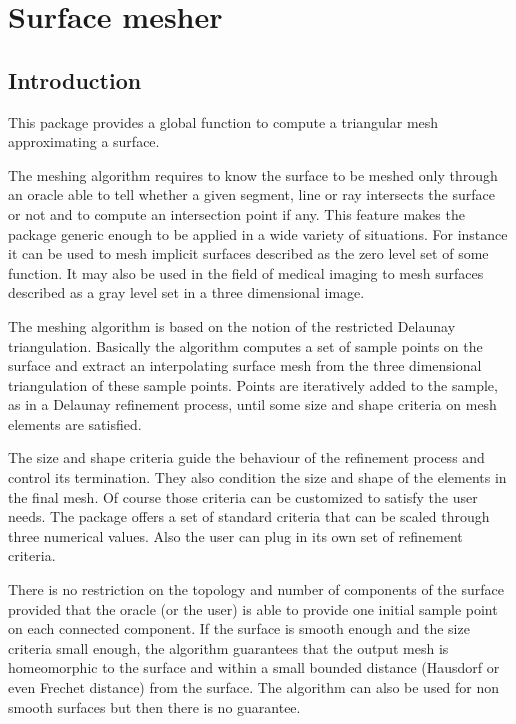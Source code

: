 \chapter{Surface mesher}
\label{chapter_SurfaceMesher}

\vspace*{-15mm}
\minitoc
\vspace*{30mm}

\section{Introduction}
\label{SurfaceMesher_section_intro}

This package provides a global function
to compute a triangular mesh approximating a surface.

The meshing algorithm requires to know the surface to be meshed
only  through an oracle able to  tell whether a
given segment, line or ray intersects the surface or not
and to compute an intersection point if any.
This feature makes the package generic enough to be
applied in a wide variety of situations. For instance it can be
used to mesh implicit surfaces described as the zero level set
of some function. It may also be used in the field of medical imaging
to mesh surfaces described as a gray
level set in a three dimensional image.


The meshing algorithm is based on the notion of the restricted
Delaunay triangulation. Basically the algorithm  computes a set of
sample points on the surface and extract an interpolating 
surface mesh  from the three dimensional triangulation of these 
sample points. Points are iteratively added to the sample,
as in a Delaunay refinement process, until some size and shape
criteria on mesh elements are satisfied. 


The size and shape criteria guide the  behaviour of
the refinement process and control its termination.
They also condition  the size and shape of the elements in the final
mesh. Of course those criteria can be customized to satisfy
the user needs. The  package offers
a set of standard criteria that can be scaled through
three numerical values. Also the user can plug in its own 
set of refinement criteria.

There is no restriction on the topology and number of components
of the surface provided that the oracle (or the user)
is able to provide one initial sample point on each connected component.
If the surface is smooth enough and the size criteria
small enough, the algorithm guarantees 
that the output mesh is homeomorphic to the
surface and within a small bounded distance
(Hausdorf or even Frechet distance) from the surface.
The algorithm can also be used for non smooth surfaces
but then there is no guarantee. 





